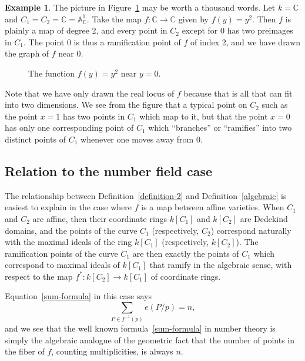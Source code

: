 \documentclass[12pt]{article}
\newcommand{\C}{\mathbb{C}}
\newcommand{\A}{\mathbb{A}}
\newcommand{\lra}{\longrightarrow}
\theoremstyle{definition}
\newtheorem{example}[theorem]{Example}
\begin{document}
\begin{example}\label{example-1}
The picture in Figure~\ref{parabola-figure} may be worth a thousand words. Let $k = \C$ and
$C_1 = C_2 = \C = \A^1_\C$. Take the map $f: \C \lra \C$ given by
$f(y) = y^2$. Then $f$ is plainly a map of degree 2, and every point
in $C_2$ except for 0 has two preimages in $C_1$. The point 0 is thus
a ramification point of $f$ of index 2, and we have drawn the graph of $f$ near $0$.
\begin{figure}
\caption{The function $f(y) = y^2$ near $y=0$.}
\label{parabola-figure}
\end{figure}

Note that we have only drawn the real locus of $f$ because that is all
that can fit into two dimensions. We see from the figure that a
typical point on $C_2$ such as the point $x = 1$ has two points in
$C_1$ which map to it, but that the point $x = 0$ has only one
corresponding point of $C_1$ which ``branches'' or ``ramifies'' into two
distinct points of $C_1$ whenever one moves away from 0.
\end{example}

\subsection{Relation to the number field case}

The relationship between Definition~\ref{definition-2} and
Definition~\ref{algebraic} is easiest to explain in the case where $f$
is a map between affine varieties. When $C_1$ and $C_2$ are affine,
then their coordinate rings $k[C_1]$ and $k[C_2]$ are Dedekind
domains, and the points of the curve $C_1$ (respectively, $C_2$)
correspond naturally with the maximal ideals of the ring $k[C_1]$
(respectively, $k[C_2]$). The ramification points of the curve $C_1$
are then exactly the points of $C_1$ which correspond to maximal
ideals of $k[C_1]$ that ramify in the algebraic sense, with respect to
the map $f^*: k[C_2] \lra k[C_1]$ of coordinate rings.

Equation~\eqref{sum-formula} in this case says
$$
\sum_{P \in f^{-1}(p)} e(P/p) = n,
$$
and we see that the well known formula~\eqref{sum-formula} in number
theory is simply the algebraic analogue of the geometric fact that the
number of points in the fiber of $f$, counting multiplicities, is
always $n$.
\end{document}
